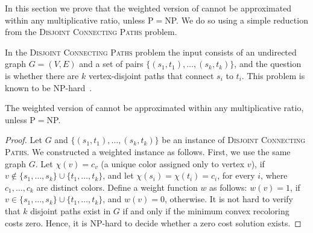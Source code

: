 \label{sec:hard}

In this section we prove that the weighted version of \TWOCR{} cannot
be approximated within any multiplicative ratio, unless P$=$NP.  We
do so using a simple reduction from the 
\textsc{Disjoint Connecting Paths} problem.

In the \textsc{Disjoint Connecting Paths} problem the input consists
of an undirected graph $G=(V,E)$ and a set of pairs $\{(s_1,
t_1), \ldots, (s_k, t_k)\}$, and the question is whether there are $k$
vertex-disjoint paths that connect $s_i$ to $t_i$.  This problem is
known to be NP-hard~\cite{karp1972reducibility}.

\begin{theorem}
The weighted version of \TWOCR{} cannot be approximated within any
 multiplicative ratio, unless P$=$NP.
\end{theorem}
\begin{proof}
Let $G$ and $\{(s_1, t_1), \ldots, (s_k, t_k)\}$ be an instance
of \textsc{Disjoint Connecting Paths}.  We constructed a
weighted \TWOCR{} instance as follows.  First, we use the same graph
$G$.  Let $\chi(v) = c_v$ (a unique color assigned only to vertex $v$), if
$v \notin \{s_1,\ldots,s_k\} \cup \{t_1,\ldots,t_k\}$, and let
$\chi(s_i) = \chi(t_i) = c_i$, for every $i$, where $c_1, \ldots, c_k$
are distinct colors.
%
Define a weight function $w$ as follows: $w(v) = 1$, if
$v \in \{s_1,\ldots,s_k\} \cup \{t_1,\ldots,t_k\}$, and $w(v) = 0$,
otherwise.
%
It is not hard to verify that $k$ disjoint paths exist in $G$ if and
only if the minimum convex recoloring costs zero.  Hence, it is
NP-hard to decide whether a zero cost solution exists.
\end{proof}
